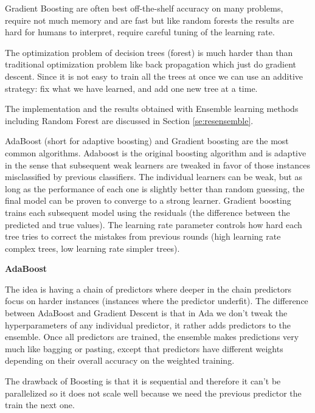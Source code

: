 \documentclass[11pt]{article}
\theoremstyle{definition}
\theoremstyle{remark}
\begin{document}
Gradient Boosting are often best off-the-shelf accuracy on many problems, require not much memory and are fast but like random forests the results are hard for humans to interpret, require careful tuning of the learning rate.

The optimization problem of decision trees (forest) is much harder than than traditional optimization problem like back propagation which just do gradient descent. Since it is not easy to train all the trees at once we can use an additive strategy: fix what we have learned, and add one new tree at a time. 

The implementation and the results obtained with Ensemble learning methods including Random Forest are discussed in Section \ref{se:resensemble}.


AdaBoost (short for adaptive boosting) and Gradient boosting are the most common algorithms. Adaboost is the original boosting algorithm and is adaptive in the sense that subsequent weak learners are tweaked in favor of those instances misclassified by previous classifiers. The individual learners can be weak, but as long as the performance of each one is slightly better than random guessing, the final model can be proven to converge to a strong learner. Gradient boosting trains each subsequent model using the residuals (the difference between the predicted and true values). The learning rate parameter controls how hard each tree tries to correct the mistakes from previous rounds (high learning rate complex trees, low learning rate simpler trees). 

\textbf{AdaBoost}

The idea is having a chain of predictors where deeper in the chain predictors focus on harder instances (instances where the predictor underfit). The difference between AdaBoost and Gradient Descent is that in Ada we don't tweak the hyperparameters of any individual predictor, it rather adds predictors to the ensemble. Once all predictors are trained, the ensemble makes predictions very much like bagging or pasting, except that predictors have different weights depending on their overall accuracy on the weighted training.

The drawback of Boosting is that it is sequential and therefore it can't be parallelized so it does not scale well because we need the previous predictor the train the next one.
\end{document}
